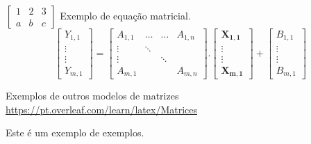         $ %
        \begin{bmatrix}
            1 & 2 & 3\\
            a & b & c
        \end{bmatrix}
        $
            Exemplo de equação matricial.
            \begin{equation}
                \begin{bmatrix}
                    Y_{1,1}\\ 
                    \vdots \\   
                    \vdots \\ 
                    Y_{m,1}
                \end{bmatrix}
                =\begin{bmatrix}
                    A_{1,1} & \ldots & \ldots & A_{1,n}\\ 
                    \vdots & \ddots &  & \\   
                    \vdots &  & \ddots  & \\ 
                    A_{m,1}&  &  & A_{m,n}
                \end{bmatrix}
                .\begin{bmatrix}
                    \mathbf{X_{1,1}} \\  %
                    \mathbf{\vdots} \\   
                    \mathbf{\vdots} \\ 
                    \mathbf{X_{m,1}}
                \end{bmatrix}
                +\begin{bmatrix}
                    B_{1,1} \\ 
                    \vdots \\   
                    \vdots \\ 
                    B_{m,1}
                \end{bmatrix}
            \end{equation}


        Exemplos de outros modelos de matrizes 
        \url{https://pt.overleaf.com/learn/latex/Matrices}
      

      


        Este é um exemplo de exemplos.
        
